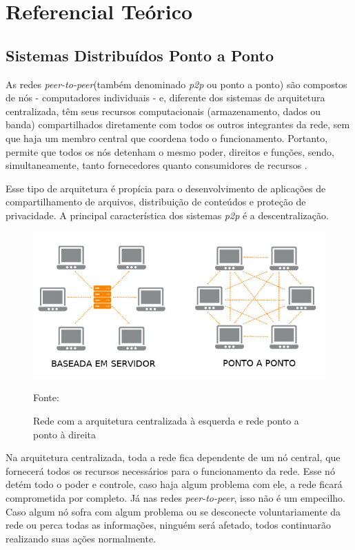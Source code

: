 \chapter{Referencial Teórico}
\label{chap:modelo}

\section{Sistemas Distribuídos Ponto a Ponto}

As redes \textit{peer-to-peer}(também denominado \textit{p2p} ou ponto a ponto) são compostos de nós - computadores individuais - e, diferente dos sistemas de arquitetura centralizada, têm seus recursos computacionais (armazenamento, dados ou banda) compartilhados diretamente com todos os outros integrantes da rede, sem que haja um membro central que coordena todo o funcionamento. Portanto, permite que todos os nós detenham o mesmo poder, direitos e funções, sendo, simultaneamente, tanto fornecedores quanto consumidores de recursos \cite{Drescher2018}.

Esse tipo de arquitetura é propícia para o desenvolvimento de aplicações de compartilhamento de arquivos, distribuição de conteúdos e proteção de privacidade. A principal característica dos sistemas \textit{p2p} é a descentralização.

\begin{figure}[h]
	\centering
	\includegraphics[width=\textwidth]{imagens/Server-based-vs-P2P-network.jpg}
	\caption{Rede com a arquitetura centralizada à esquerda e rede ponto a ponto à direita}
	Fonte: \cite{Wowza}
	\label{fig:redes}
\end{figure}

Na arquitetura centralizada, toda a rede fica dependente de um nó central, que fornecerá todos os recursos necessários para o funcionamento da rede. Esse nó detém todo o poder e controle, caso haja algum problema com ele, a rede ficará comprometida por completo. Já nas redes \textit{peer-to-peer}, isso não é um empecilho. Caso algum nó sofra com algum problema ou se desconecte voluntariamente da rede ou perca todas as informações, ninguém será afetado, todos continuarão realizando suas ações normalmente.

